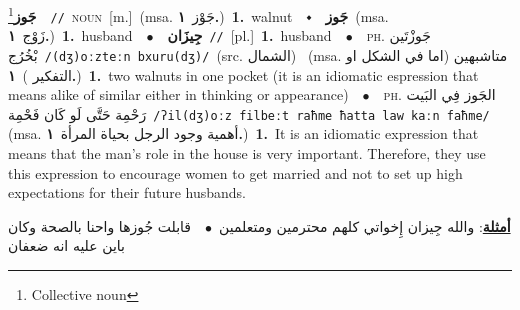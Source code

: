 \documentclass[10pt,a4paper,twoside]{article} %
\begin{document}
\begin{multicols}{2}
{\setlength\topsep{0pt}\textbf{\foreignlanguage{arabic}{جَوز}}\footnote{Collective noun}\ \ {\color{gray}\texttt{//}\color{black}}\ \textsc{noun}\ [m.]\ \color{gray}(msa. \foreignlanguage{arabic}{جَوْز}~\foreignlanguage{arabic}{\textbf{١.}})\color{black}\ \textbf{1.}~walnut\ \ $\smblkdiamond$\ \ \setlength\topsep{0pt}\textbf{\foreignlanguage{arabic}{جَوز}}\ \color{gray}(msa. \foreignlanguage{arabic}{زَوْج}~\foreignlanguage{arabic}{\textbf{١.}})\color{black}\ \textbf{1.}~husband\ \ $\bullet$\ \ \setlength\topsep{0pt}\textbf{\foreignlanguage{arabic}{جِيزَان}}\ {\color{gray}\texttt{//}\color{black}}\ [pl.]\ \textbf{1.}~husband\ \ $\bullet$\ \ \textsc{ph.} \color{gray} \foreignlanguage{arabic}{جَوزْتَين بْخُرُج}\color{black}\ {\color{gray}\texttt{/{\sffamily (dʒ)oːzteːn bxuru(dʒ)}/}\color{black}}\ \color{gray}(src. \foreignlanguage{arabic}{الشمال})\color{black}\ \color{gray} (msa. \foreignlanguage{arabic}{متاشبهين (اما في الشكل او التفكير )}~\foreignlanguage{arabic}{\textbf{١.}})\color{black}\ \textbf{1.}~two walnuts in one pocket (it is an idiomatic espression that means alike of similar either in thinking or appearance)\ \ $\bullet$\ \ \textsc{ph.} \color{gray} \foreignlanguage{arabic}{الجَوز فِي البَيت رَحْمِة حَتَّى لَو كَان فَحْمِة}\color{black}\ {\color{gray}\texttt{/{\sffamily ʔil(dʒ)oːz filbeːt raħme ħatta law kaːn faħme}/}\color{black}}\ \color{gray} (msa. \foreignlanguage{arabic}{أهمية وجود الرجل بحياة المرأة}~\foreignlanguage{arabic}{\textbf{١.}})\color{black}\ \textbf{1.}~It is an idiomatic expression that means that the man's role in the house is very important. Therefore, they use this expression to encourage women to get married and not to set up high expectations for their future husbands.\  \begin{flushright}\color{gray}\foreignlanguage{arabic}{\textbf{\underline{\foreignlanguage{arabic}{أمثلة}}}: والله جِيزان إِخواتي كلهم محترمين ومتعلمين\ $\bullet$\ \  قابلت جُوزها واحنا بالصحة وكان باين عليه انه ضعفان}\end{flushright}\color{black}} \vspace{2mm}


\end{multicols}
\end{document}
